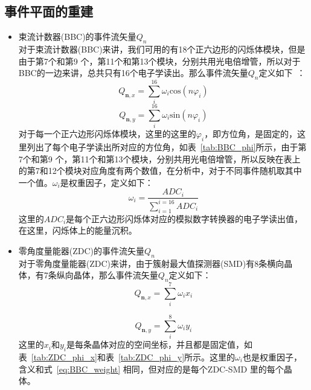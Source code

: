 \subsection{事件平面的重建}
\begin{itemize}
\item 束流计数器(BBC)的事件流矢量$Q_{n}$ \\
对于束流计数器(BBC)来讲，我们可用的有18个正六边形的闪烁体模块，但是由于第7个和第9 个，第11个和第13个模块，分别共用光电倍增管，所以对于BBC的一边来讲，总共只有16个电子学读出。那么事件流矢量$Q_{n}$定义如下~\cite{Poskanzer:1998yz,Voloshin:2008dg}：
\begin{equation}
\label{eq:BBC_Qn_x}
Q_{\textbf{n},x} = \sum_{i}^{16}\omega_{i}\mathrm{cos}(n\varphi_{i})
\end{equation}
\begin{equation}
\label{eq:BBC_Qn_y}
Q_{\textbf{n},y} = \sum_{i}^{16}\omega_{i}\mathrm{sin}(n\varphi_{i})
\end{equation}
对于每一个正六边形闪烁体模块，这里的这里的$\varphi_{i}$，即方位角，是固定的，这里列出了每个电子学读出所对应的方位角，如表~\ref{tab:BBC_phi}所示，由于第7个和第9 个，第11个和第13个模块，分别共用光电倍增管，所以反映在表上的第7和12个模块对应角度有两个数值，在分析中，对于不同事件随机取其中一个值。$\omega_{i}$是权重因子，定义如下：
\begin{equation}
\label{eq:BBC_weight}
\omega_{i} = \frac{ADC_{i}}{\sum_{i=1}^{i=16}ADC_{i}}
\end{equation}
这里的$ADC_{i}$是每个正六边形闪烁体对应的模拟数字转换器的电子学读出值，在这里，闪烁体上的能量沉积。

\item 零角度量能器(ZDC)的事件流矢量$Q_{n}$ \\
对于零角度量能器(ZDC)来讲，由于簇射最大值探测器(SMD)有8条横向晶体，有7条纵向晶体，那么事件流矢量$Q_{n}$定义如下：
\begin{equation}
\label{eq:ZDC_Qn_x}
Q_{\textbf{n},x} = \sum_{i}^{7}\omega_{i}x_{i}
\end{equation}

\begin{equation}
\label{eq:ZDC_Qn_y}
Q_{\textbf{n},y} = \sum_{i}^{8}\omega_{i}y_{i}
\end{equation}
这里的$x_{i}$和$y_{i}$是每条晶体对应的空间坐标，并且都是固定值，如表~\ref{tab:ZDC_phi_x}和表~\ref{tab:ZDC_phi_y}所示。这里的$\omega_{i}$也是权重因子，含义和式~\ref{eq:BBC_weight} 相同，但对应的是每个ZDC-SMD 里的每个晶体。
\end{itemize}

